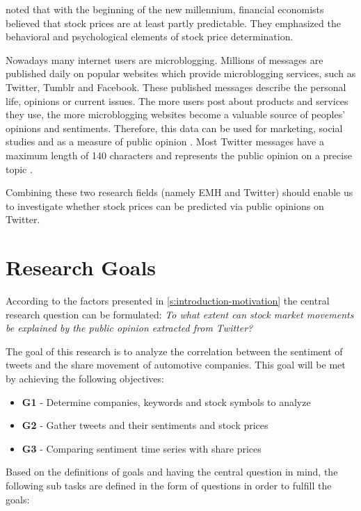 \citet{Malkiel2003} noted that with the beginning of the new millennium, financial economists believed that stock prices are at least partly predictable.
They emphasized the behavioral and psychological elements of stock price determination.

Nowadays many internet users are microblogging.
Millions of messages are published daily on popular websites which provide microblogging services, such as Twitter, Tumblr and Facebook.
These published messages describe the personal life, opinions or current issues.
The more users post about products and services they use, the more microblogging websites become a valuable source of peoples' opinions and sentiments.
Therefore, this data can be used for marketing, social studies and as a measure of public opinion
\citep{Patodkar2016a, Pagolu2016a}. 
Most Twitter messages have a maximum length of 140 characters and represents the public opinion on a precise topic
\citep{Pagolu2016a}.

Combining these two research fields (namely \ac{EMH} and Twitter) should enable us to investigate whether stock prices can be predicted via public opinions on Twitter.

\section{Research Goals}
\label{s:introduction-researchgoals}

According to the factors presented in \cref{s:introduction-motivation} the central research question can be formulated:
\emph{To what extent can stock market movements be explained by the public opinion extracted from Twitter?}

The goal of this research is to analyze the correlation between the sentiment of tweets and the share movement of automotive companies.
This goal will be met by achieving the following objectives:

\begin{itemize}
    \item \textbf{G1} - Determine companies, keywords and stock symbols to analyze
    \item \textbf{G2} - Gather tweets and their sentiments and stock prices
    \item \textbf{G3} - Comparing sentiment time series with share prices
\end{itemize}

Based on the definitions of goals and having the central question in mind, the following sub tasks are defined in the form of questions in order to fulfill the goals:

